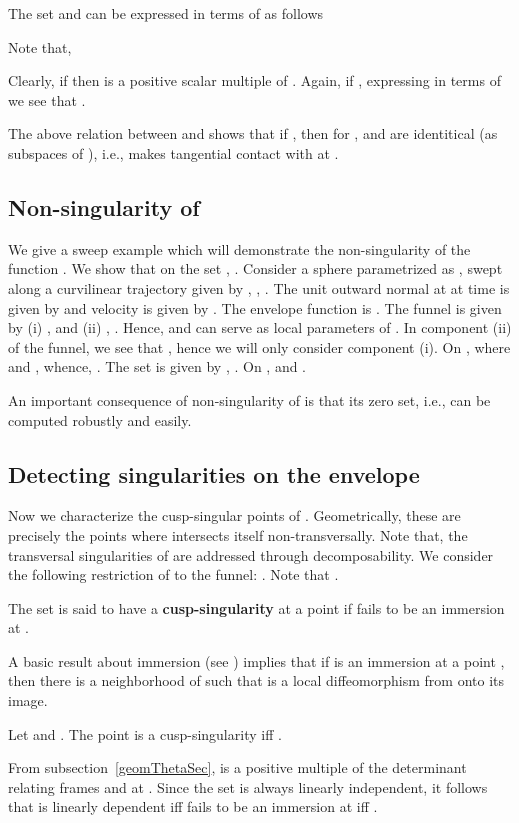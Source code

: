 \documentclass{elsart5p}
\begin{document}
The set  and can be expressed in terms of 
 as follows

Note that,

Clearly, if  then  is a positive scalar multiple of .  
Again, if , expressing  in terms of 
 we see that .  

The above relation between  and 
 shows that 
if , then for ,  
and  are identitical 
(as subspaces of ), i.e., 
 makes tangential contact with  at .


\subsection{Non-singularity of }  \label{thetaNonSingSec}

We give a sweep example which will demonstrate the non-singularity of the function .  We show 
that on the set , .
Consider a sphere parametrized as ,   
swept along a curvilinear trajectory given by , , .
The unit outward normal at  at time  is given by  and velocity is given by 
.  The envelope function is .  The 
funnel  is given by (i) ,  and (ii) , .  
Hence,  and  can serve as local parameters of .  In component (ii) of the funnel, we see that 
 , hence we will only 
consider component (i).  On ,  where
 and , whence, .  The set 
 is given by , .  
On ,  
and .   

An important consequence of non-singularity of  is that its zero set, i.e.,  
can be computed robustly and easily.

\subsection{Detecting singularities on the envelope} \label{singSec}

Now we characterize the cusp-singular points of . Geometrically, these
are precisely the points where  intersects itself non-transversally.
Note that, the transversal singularities of  are addressed through
decomposability.
We consider the following restriction of  to the funnel:
.
Note that .

\begin{defn} \label{singDef}
The set  is said to have a {\bf cusp-singularity} at a point  if 
 fails to be an immersion at . 
\end{defn}
A basic result about immersion (see \cite{diffTop}) implies that 
if  is an immersion at a point , then there is a neighborhood  of  such
that  is a local diffeomorphism from  onto
its image.

\begin{lem} \label{singLem}
Let  and . The point   is a 
cusp-singularity iff .
\end{lem}
  From subsection~\ref{geomThetaSec},  is a positive multiple of 
the determinant relating frames  and 
 at  .  Since the set  
is always linearly independent, it follows that  is linearly 
dependent iff  fails to be an immersion at  iff .
\hfill 
\end{document}
